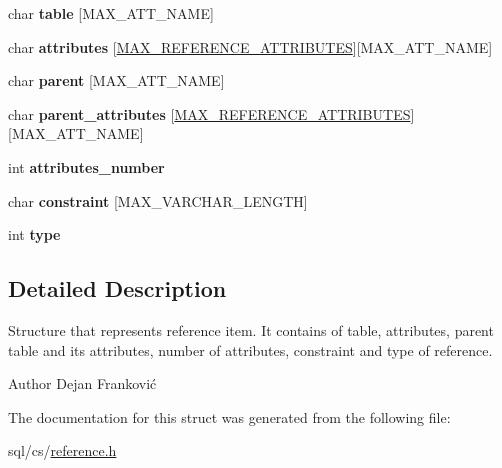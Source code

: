 \begin{DoxyCompactItemize}
\item 
char {\bfseries table} \mbox{[}M\+A\+X\+\_\+\+A\+T\+T\+\_\+\+N\+A\+ME\mbox{]}\hypertarget{structAK__ref__item_a6605be7179a6bb7de63596f21e031fdb}{}\label{structAK__ref__item_a6605be7179a6bb7de63596f21e031fdb}

\item 
char {\bfseries attributes} \mbox{[}\hyperlink{reference_8h_a1892ca5d8fd96ba1813befff40c84ebd}{M\+A\+X\+\_\+\+R\+E\+F\+E\+R\+E\+N\+C\+E\+\_\+\+A\+T\+T\+R\+I\+B\+U\+T\+ES}\mbox{]}\mbox{[}M\+A\+X\+\_\+\+A\+T\+T\+\_\+\+N\+A\+ME\mbox{]}\hypertarget{structAK__ref__item_aad3f2e85932e88100916097e3c1f6a41}{}\label{structAK__ref__item_aad3f2e85932e88100916097e3c1f6a41}

\item 
char {\bfseries parent} \mbox{[}M\+A\+X\+\_\+\+A\+T\+T\+\_\+\+N\+A\+ME\mbox{]}\hypertarget{structAK__ref__item_a812f807b2d92ad0cbc9370be98fb24cf}{}\label{structAK__ref__item_a812f807b2d92ad0cbc9370be98fb24cf}

\item 
char {\bfseries parent\+\_\+attributes} \mbox{[}\hyperlink{reference_8h_a1892ca5d8fd96ba1813befff40c84ebd}{M\+A\+X\+\_\+\+R\+E\+F\+E\+R\+E\+N\+C\+E\+\_\+\+A\+T\+T\+R\+I\+B\+U\+T\+ES}\mbox{]}\mbox{[}M\+A\+X\+\_\+\+A\+T\+T\+\_\+\+N\+A\+ME\mbox{]}\hypertarget{structAK__ref__item_a4c79ce00096ba5a132d7d11faa94163b}{}\label{structAK__ref__item_a4c79ce00096ba5a132d7d11faa94163b}

\item 
int {\bfseries attributes\+\_\+number}\hypertarget{structAK__ref__item_a69a83ced852fc6e01cfcb0615ad7fc63}{}\label{structAK__ref__item_a69a83ced852fc6e01cfcb0615ad7fc63}

\item 
char {\bfseries constraint} \mbox{[}M\+A\+X\+\_\+\+V\+A\+R\+C\+H\+A\+R\+\_\+\+L\+E\+N\+G\+TH\mbox{]}\hypertarget{structAK__ref__item_ad1a4236d0f4737ff6cc6b2069e14d402}{}\label{structAK__ref__item_ad1a4236d0f4737ff6cc6b2069e14d402}

\item 
int {\bfseries type}\hypertarget{structAK__ref__item_ac9dadb8ee5112dce17f5dfa5e48b9692}{}\label{structAK__ref__item_ac9dadb8ee5112dce17f5dfa5e48b9692}

\end{DoxyCompactItemize}


\subsection{Detailed Description}
Structure that represents reference item. It contains of table, attributes, parent table and it\textquotesingle{}s attributes, number of attributes, constraint and type of reference. 

\begin{DoxyAuthor}{Author}
Dejan Franković 
\end{DoxyAuthor}


The documentation for this struct was generated from the following file\+:\begin{DoxyCompactItemize}
\item 
sql/cs/\hyperlink{reference_8h}{reference.\+h}\end{DoxyCompactItemize}
